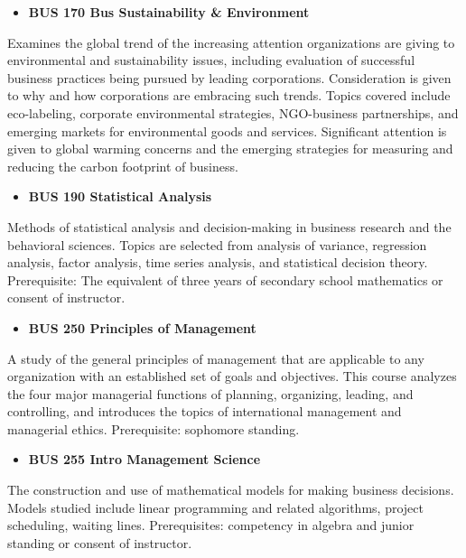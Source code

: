 \documentclass[
  letterpaper,
]{scrbook}
\providecommand{\tightlist}{%
  \setlength{\itemsep}{0pt}\setlength{\parskip}{0pt}}
\begin{document}
\begin{itemize}
\tightlist
\item
  \textbf{BUS 170 Bus Sustainability \& Environment}
\end{itemize}

Examines the global trend of the increasing attention organizations are
giving to environmental and sustainability issues, including evaluation
of successful business practices being pursued by leading corporations.
Consideration is given to why and how corporations are embracing such
trends. Topics covered include eco-labeling, corporate environmental
strategies, NGO-business partnerships, and emerging markets for
environmental goods and services. Significant attention is given to
global warming concerns and the emerging strategies for measuring and
reducing the carbon footprint of business.

\begin{itemize}
\tightlist
\item
  \textbf{BUS 190 Statistical Analysis}
\end{itemize}

Methods of statistical analysis and decision-making in business research
and the behavioral sciences. Topics are selected from analysis of
variance, regression analysis, factor analysis, time series analysis,
and statistical decision theory. Prerequisite: The equivalent of three
years of secondary school mathematics or consent of instructor.

\begin{itemize}
\tightlist
\item
  \textbf{BUS 250 Principles of Management}
\end{itemize}

A study of the general principles of management that are applicable to
any organization with an established set of goals and objectives. This
course analyzes the four major managerial functions of planning,
organizing, leading, and controlling, and introduces the topics of
international management and managerial ethics. Prerequisite: sophomore
standing.

\begin{itemize}
\tightlist
\item
  \textbf{BUS 255 Intro Management Science}
\end{itemize}

The construction and use of mathematical models for making business
decisions. Models studied include linear programming and related
algorithms, project scheduling, waiting lines. Prerequisites: competency
in algebra and junior standing or consent of instructor.
\end{document}
